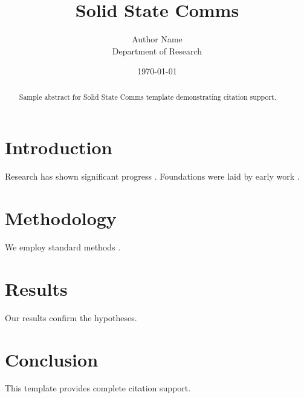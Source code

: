 ﻿\documentclass{elsarticle}
\title{Solid State Comms}
\author{Author Name \\ \small Department of Research}
\date{\today}
\begin{document}
\maketitle

\begin{abstract}
Sample abstract for Solid State Comms template demonstrating citation support.
\end{abstract}

\section{Introduction}
Research has shown significant progress \citep{einstein1905}. Foundations were laid by early work \citep{turing1950}.

\section{Methodology}
We employ standard methods \citep{knuth1984}.

\section{Results}
Our results confirm the hypotheses.

\section{Conclusion}
This template provides complete citation support.



\end{document}
